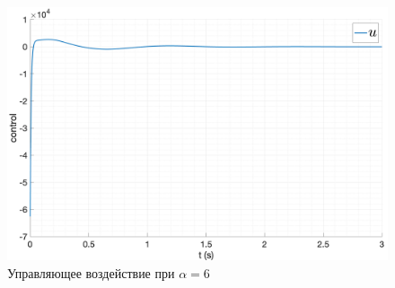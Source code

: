 \begin{figure}[ht!]
    \centering
    \includegraphics[width=\textwidth]{media/plots/nonmodal_controllers/u_3.png}
    \caption{Управляющее воздействие при $\alpha = 6$}
    \label{fig:nonmodal_control_alpha_3_u}
\end{figure}

